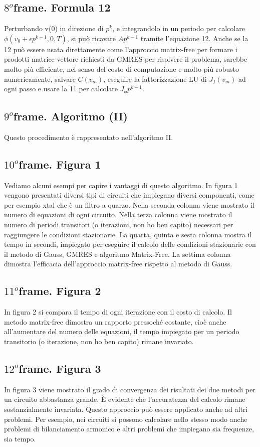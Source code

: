 \documentclass[a4paper]{article}
\begin{document}
\subsection*{$8^o$frame. Formula 12}
Perturbando v(0) in direzione di $p^k$, e integrandolo in un periodo per calcolare $\phi(v_0+\epsilon p^{k-1},0,T)$, si può ricavare $Ap^{k-1}$ tramite l’equazione 12. Anche se la 12 può essere usata direttamente come l’approccio matrix-free per formare i prodotti matrice-vettore richiesti da GMRES per risolvere il problema, sarebbe molto più efficiente, nel senso del costo di computazione e molto più robusto numericamente, salvare $C(v_m)$, eseguire la fattorizzazione LU di $J_f(v_m)$ ad ogni passo e usare la 11 per calcolare $J_{\phi} p^{k-1}$. 
\subsection*{$9^o$frame. Algoritmo (II)}
Questo procedimento è rappresentato nell’algoritmo II.
\subsection*{$10^o$frame. Figura 1}
Vediamo alcuni esempi per capire i vantaggi di questo algoritmo. In figura 1 vengono presentati diversi tipi di circuiti che impiegano diversi componenti, come per esempio xtal che è un filtro a quarzo. Nella seconda colonna viene mostrato il numero di equazioni di ogni circuito. Nella terza colonna viene mostrato il numero di periodi transitori (o iterazioni, non ho ben capito) necessari per raggiungere le condizioni stazionarie. La quarta, quinta e sesta colonna mostra il tempo in secondi, impiegato per eseguire il calcolo delle condizioni stazionarie con il metodo di Gauss, GMRES e algoritmo Matrix-Free. La settima colonna dimostra l’efficacia dell’approccio matrix-free rispetto al metodo di Gauss.
\subsection*{$11^o$frame. Figura 2}
In figura 2 si compara il tempo di ogni iterazione con il costo di calcolo. Il metodo matrix-free dimostra un rapporto pressoché costante, cioè anche all’aumentare del numero delle equazioni, il tempo impiegato per un periodo transitorio (o iterazione, non ho ben capito) rimane invariato.
\subsection*{$12^o$frame. Figura 3}
In figura 3 viene mostrato il grado di convergenza dei risultati dei due metodi per un circuito abbastanza grande. È evidente che l’accuratezza del calcolo rimane sostanzialmente invariata.
Questo approccio può essere applicato anche ad altri problemi. Per esempio, nei circuiti si possono calcolare nello stesso modo anche problemi di bilanciamento armonico e altri problemi che impiegano sia frequenze, sia tempo. 
\end{document}
